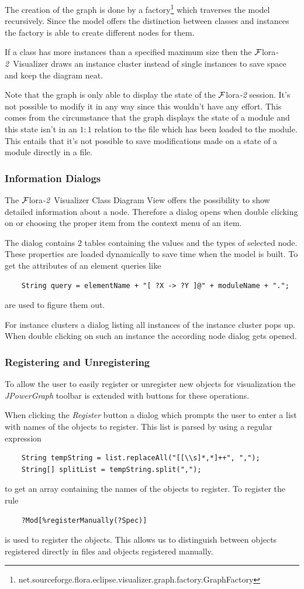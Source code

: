 \documentclass[a4paper,11pt]{article}
\newcommand{\FLORA}{{\mbox{\sc ${\cal F}${lora}\rm\emph{-2}}}\xspace}
\newcommand{\FVIZ}{{\mbox{\sc ${\cal F}${lora}\rm\emph{-2} {Visualizer}}}\xspace}
\begin{document}
The creation of the graph is done by a factory\footnote{
net.sourceforge.flora.eclipse.visualizer.graph.factory.GraphFactory}
which traverses the model recursively. Since the model offers the
distinction between classes and instances the factory is
able to create different nodes for them.

If a class has more instances than a specified maximum size
then the \FVIZ draws an instance cluster instead of single
instances to save space and keep the diagram neat.

Note that the graph is only able to display the state of
the \FLORA session. It's not possible to modify it in any
way since this wouldn't have any effort. This comes from
the circumstance that the graph displays the state of a module
and this state isn't in an $1:1$ relation to the file which
has been loaded to the module. This entails that it's not
possible to save modifications made on a state of a module
directly in a file.

\subsubsection{Information Dialogs}
The \FVIZ Class Diagram View offers the possibility to show
detailed information about a node. Therefore a dialog opens
when double clicking on or choosing the proper
item from the context menu of an item.

The dialog contains 2 tables containing the values and the
types of selected node. These properties are loaded dynamically
to save time when the model is built.
To get the attributes of an element queries like
\begin{verbatim}
    String query = elementName + "[ ?X -> ?Y ]@" + moduleName + ".";
\end{verbatim}
are used to figure them out.

For instance clusters a dialog listing all instances of the instance
cluster pops up. When double clicking on such an instance the
according node dialog gets opened.

\subsubsection{Registering and Unregistering}
To allow the user to easily register or unregister new objects for
visualization the \emph{JPowerGraph} toolbar is extended with buttons
for these operations.

When clicking the \emph{Register} button a dialog which prompts
the user to enter a list with names of the objects to register.
This list is parsed by using a regular expression
\begin{verbatim}
    String tempString = list.replaceAll("[[\\s]*,*]++", ",");
    String[] splitList = tempString.split(",");
\end{verbatim}
to get an array containing the names of the objects to register.
To register the rule
\begin{verbatim}
    ?Mod[%registerManually(?Spec)]
\end{verbatim}
is used to register the objects. This allows us to distinguish between
objects registered directly in files and objects registered manually.
\end{document}
